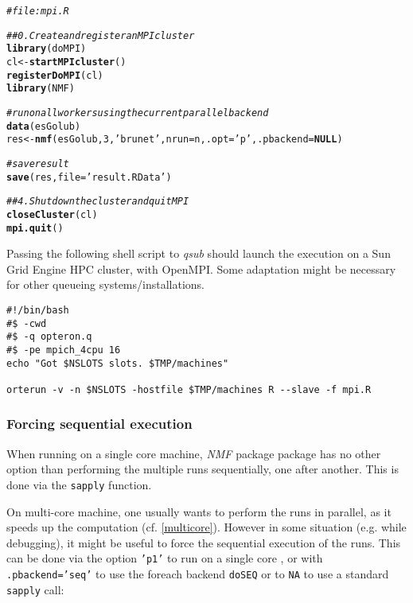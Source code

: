 \documentclass[a4paper]{article}\usepackage[]{graphicx}\usepackage[]{color}
\makeatletter
\newcommand{\hlnum}[1]{\textcolor[rgb]{0.686,0.059,0.569}{#1}}%
\newcommand{\hlstr}[1]{\textcolor[rgb]{0.192,0.494,0.8}{#1}}%
\newcommand{\hlcom}[1]{\textcolor[rgb]{0.678,0.584,0.686}{\textit{#1}}}%
\newcommand{\hlstd}[1]{\textcolor[rgb]{0.345,0.345,0.345}{#1}}%
\newcommand{\hlkwa}[1]{\textcolor[rgb]{0.161,0.373,0.58}{\textbf{#1}}}%
\newcommand{\hlkwb}[1]{\textcolor[rgb]{0.69,0.353,0.396}{#1}}%
\newcommand{\hlkwc}[1]{\textcolor[rgb]{0.333,0.667,0.333}{#1}}%
\newcommand{\hlkwd}[1]{\textcolor[rgb]{0.737,0.353,0.396}{\textbf{#1}}}%
\newenvironment{kframe}{%
 \def\at@end@of@kframe{}%
 \ifinner\ifhmode%
  \def\at@end@of@kframe{\end{minipage}}%
  \begin{minipage}{\columnwidth}%
 \fi\fi%
 \def\FrameCommand##1{\hskip\@totalleftmargin \hskip-\fboxsep
 \colorbox{shadecolor}{##1}\hskip-\fboxsep
     \hskip-\linewidth \hskip-\@totalleftmargin \hskip\columnwidth}%
 \MakeFramed {\advance\hsize-\width
   \@totalleftmargin\z@ \linewidth\hsize
   \@setminipage}}%
 {\par\unskip\endMakeFramed%
 \at@end@of@kframe}
\newenvironment{knitrout}{}{} %
\let\code=\texttt
\newcommand{\pkgname}[1]{\textit{#1}\xspace}
\newcommand{\Rpkg}[1]{\pkgname{#1} package\xspace}
\newcommand{\nmfpack}{\Rpkg{NMF}}
\makeatother
\begin{document}
\begin{knitrout}
\color{fgcolor}\begin{kframe}
\begin{alltt}
\hlcom{# file: mpi.R}

\hlcom{## 0. Create and register an MPI cluster}
\hlkwd{library}\hlstd{(doMPI)}
\hlstd{cl} \hlkwb{<-} \hlkwd{startMPIcluster}\hlstd{()}
\hlkwd{registerDoMPI}\hlstd{(cl)}
\hlkwd{library}\hlstd{(NMF)}

\hlcom{# run on all workers using the current parallel backend}
\hlkwd{data}\hlstd{(esGolub)}
\hlstd{res} \hlkwb{<-} \hlkwd{nmf}\hlstd{(esGolub,} \hlnum{3}\hlstd{,} \hlstr{'brunet'}\hlstd{,} \hlkwc{nrun}\hlstd{=n,} \hlkwc{.opt}\hlstd{=}\hlstr{'p'}\hlstd{,} \hlkwc{.pbackend}\hlstd{=}\hlkwa{NULL}\hlstd{)}

\hlcom{# save result}
\hlkwd{save}\hlstd{(res,} \hlkwc{file}\hlstd{=}\hlstr{'result.RData'}\hlstd{)}

\hlcom{## 4. Shutdown the cluster and quit MPI}
\hlkwd{closeCluster}\hlstd{(cl)}
\hlkwd{mpi.quit}\hlstd{()}
\end{alltt}
\end{kframe}
\end{knitrout}

Passing the following shell script to \emph{qsub} should launch the execution on a Sun Grid Engine HPC cluster, with OpenMPI.
Some adaptation might be necessary for other queueing systems/installations.

\begin{shaded}
\small
\begin{verbatim}
#!/bin/bash
#$ -cwd 
#$ -q opteron.q
#$ -pe mpich_4cpu 16
echo "Got $NSLOTS slots. $TMP/machines"

orterun -v -n $NSLOTS -hostfile $TMP/machines R --slave -f mpi.R
\end{verbatim}
\end{shaded}

\subsubsection{Forcing sequential execution}
When running on a single core machine, \nmfpack package has no other option than performing the multiple runs sequentially, one after another. 
This is done via the \code{sapply} function.

On multi-core machine, one usually wants to perform the runs in parallel, as it speeds up the computation (cf. \cref{multicore}).
However in some situation (e.g. while debugging), it might be useful to force the sequential execution of the runs. 
This can be done via the option \code{'p1'} to run on a single core , or with
\code{.pbackend='seq'} to use the foreach backend \code{doSEQ} or to \code{NA} to use a standard \code{sapply} call:
\end{document}
